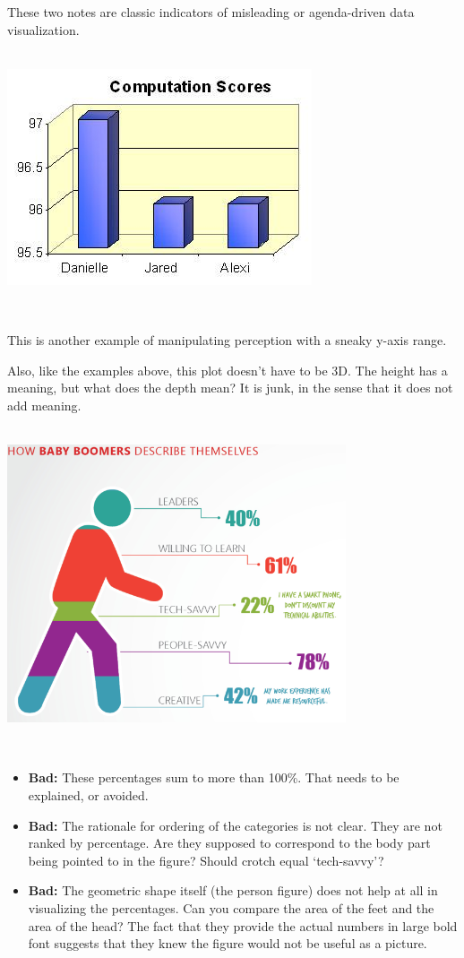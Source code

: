 \documentclass[]{book}
\begin{document}
These two notes are classic indicators of misleading or agenda-driven data visualization.

~\\

\includegraphics{img/vis12.jpg}

~

This is another example of manipulating perception with a sneaky y-axis range.

Also, like the examples above, this plot doesn't have to be 3D. The height has a meaning, but what does the depth mean? It is junk, in the sense that it does not add meaning.

~\\

\includegraphics[width=0.75\textwidth,height=\textheight]{img/vis12.png}

~

\begin{itemize}
\item
  \textbf{Bad:} These percentages sum to more than 100\%. That needs to be explained, or avoided.
\item
  \textbf{Bad:} The rationale for ordering of the categories is not clear. They are not ranked by percentage. Are they supposed to correspond to the body part being pointed to in the figure? Should crotch equal `tech-savvy'?
\item
  \textbf{Bad:} The geometric shape itself (the person figure) does not help at all in visualizing the percentages. Can you compare the area of the feet and the area of the head? The fact that they provide the actual numbers in large bold font suggests that they knew the figure would not be useful as a picture.
\end{itemize}
\end{document}
